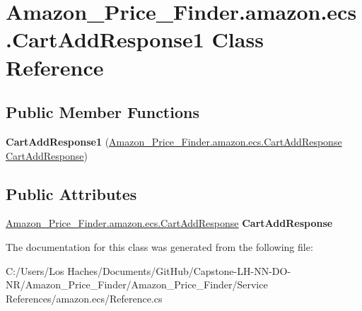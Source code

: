 \hypertarget{class_amazon___price___finder_1_1amazon_1_1ecs_1_1_cart_add_response1}{\section{Amazon\-\_\-\-Price\-\_\-\-Finder.\-amazon.\-ecs.\-Cart\-Add\-Response1 Class Reference}
\label{class_amazon___price___finder_1_1amazon_1_1ecs_1_1_cart_add_response1}
}
\subsection*{Public Member Functions}
\begin{DoxyCompactItemize}
\item 
\hypertarget{class_amazon___price___finder_1_1amazon_1_1ecs_1_1_cart_add_response1_a787ebaf4739841deee6ed1643286be79}{{\bfseries Cart\-Add\-Response1} (\hyperlink{class_amazon___price___finder_1_1amazon_1_1ecs_1_1_cart_add_response}{Amazon\-\_\-\-Price\-\_\-\-Finder.\-amazon.\-ecs.\-Cart\-Add\-Response} \hyperlink{class_amazon___price___finder_1_1amazon_1_1ecs_1_1_cart_add_response}{Cart\-Add\-Response})}\label{class_amazon___price___finder_1_1amazon_1_1ecs_1_1_cart_add_response1_a787ebaf4739841deee6ed1643286be79}

\end{DoxyCompactItemize}
\subsection*{Public Attributes}
\begin{DoxyCompactItemize}
\item 
\hypertarget{class_amazon___price___finder_1_1amazon_1_1ecs_1_1_cart_add_response1_aa6fa09bb0b54729bc6f9869fad18a9c9}{\hyperlink{class_amazon___price___finder_1_1amazon_1_1ecs_1_1_cart_add_response}{Amazon\-\_\-\-Price\-\_\-\-Finder.\-amazon.\-ecs.\-Cart\-Add\-Response} {\bfseries Cart\-Add\-Response}}\label{class_amazon___price___finder_1_1amazon_1_1ecs_1_1_cart_add_response1_aa6fa09bb0b54729bc6f9869fad18a9c9}

\end{DoxyCompactItemize}


The documentation for this class was generated from the following file\-:\begin{DoxyCompactItemize}
\item 
C\-:/\-Users/\-Los Haches/\-Documents/\-Git\-Hub/\-Capstone-\/\-L\-H-\/\-N\-N-\/\-D\-O-\/\-N\-R/\-Amazon\-\_\-\-Price\-\_\-\-Finder/\-Amazon\-\_\-\-Price\-\_\-\-Finder/\-Service References/amazon.\-ecs/Reference.\-cs\end{DoxyCompactItemize}
